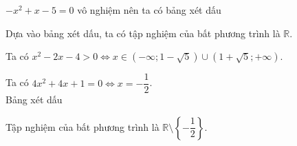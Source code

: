 \begin{bt}
{\begin{listEX}
			\item $-x^2+x-5=0$ vô nghiệm nên ta có bảng xét dấu
			\begin{center}
			\end{center}
			Dựa vào bảng xét dấu, ta có tập nghiệm của bất phương trình là $\mathbb{R}$.
			\item Ta có $x^2-2x-4>0\Leftrightarrow x\in\left(-\infty;1-\sqrt{5}\right)\cup \left(1+\sqrt{5};+\infty\right)$.
			\item Ta có $4x^2+4x+1=0\Leftrightarrow x=-\dfrac{1}{2} $.\\
			Bảng xét dấu
			\begin{center}
			\end{center}
			Tập nghiệm của bất phương trình là $\mathbb{R}\setminus\left\{-\dfrac{1}{2}\right\}$.
			
		\end{listEX}
	}
\end{bt}

